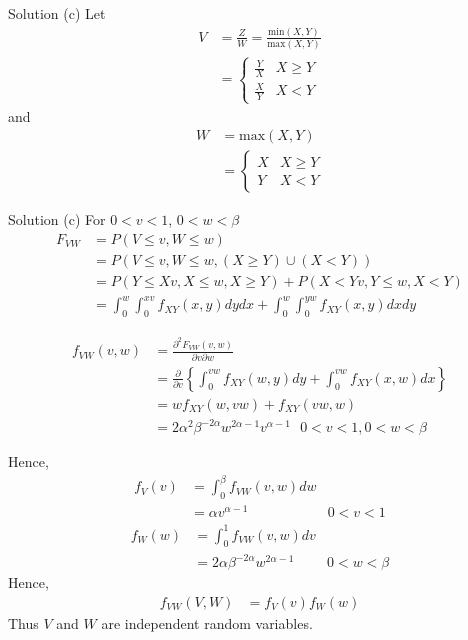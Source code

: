 \documentclass{beamer}
\providecommand{\cbrak}[1]{\ensuremath{\left\{#1\right\}}}
\begin{document}
\begin{frame}{Solution (c)}
Let 
\begin{align}
    V &= \frac{Z}{W} = \frac{\text{min}(X,Y)}{\text{max}(X,Y)}\\
    &= \begin{cases}
    \frac{Y}{X} & X\ge Y\\
    \frac{X}{Y} & X < Y
    \end{cases}
\end{align}
and
\begin{align}
    W &= \text{max}(X,Y)\\
    &= \begin{cases}
    X & X \ge Y\\
    Y & X < Y
    \end{cases}
\end{align}
\end{frame}
\begin{frame}{Solution (c)}
For $0<v<1$, $0<w<\beta$
\begin{align}
    F_{VW} &= P(V\le v,W\le w)\\
    &= P(V \le v,W \le w, (X \ge Y)\cup(X < Y))\\
    &= P(Y \le Xv, X \le w, X \ge Y) + P(X < Yv, Y \le w, X < Y)\\
    &= \int_0^w\int_0^{xv}f_{XY}(x,y)dydx + \int_0^w\int_0^{yw}f_{XY}(x,y)dxdy
\end{align}
\end{frame}
\begin{frame}
\begin{align}
    f_{VW}(v,w) &= \frac{\partial^2F_{VW}(v,w)}{\partial v\partial w}\\
    &= \frac{\partial}{\partial v}\cbrak{\int_0^{vw}f_{XY}(w,y)dy + \int_0^{vw}f_{XY}(x,w)dx}\\
    &= w{f_{XY}(w,vw)+f_{XY}(vw,w)}\\
    &= 2\alpha^2\beta^{-2\alpha}w^{2\alpha-1}v^{\alpha-1} \text{  } 0<v<1,0<w<\beta  
\end{align}
\end{frame}
Hence,
\begin{align}
    f_V(v) &= \int_0^\beta f_{VW}(v,w)dw \\
    &= \alpha v^{\alpha-1} & 0<v<1
\end{align}
\begin{align}
    f_W(w) &= \int_0^1f_{VW}(v,w)dv\\
    &= 2\alpha\beta^{-2\alpha}w^{2\alpha-1} & 0<w<\beta
\end{align}
Hence,
\begin{align}
    f_{VW}(V,W) &= f_V(v)f_W(w)
\end{align}
Thus $V$ and $W$ are independent random variables.
\end{document}
